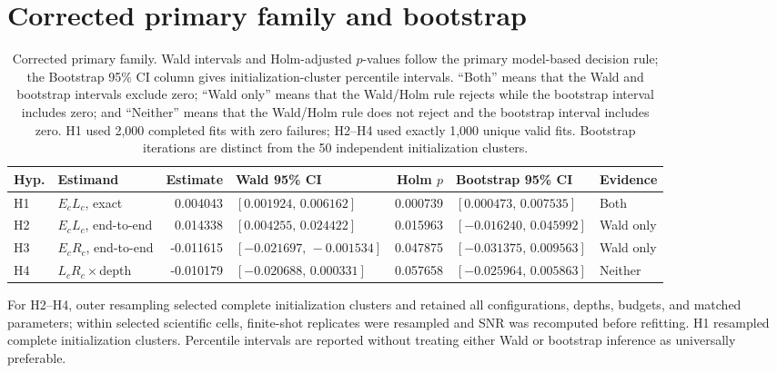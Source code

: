 \documentclass[pdflatex,sn-basic,Numbered]{sn-jnl}
\begin{document}
\section{Corrected primary family and bootstrap}

\begin{table}[t]
\centering
\footnotesize
\begin{tabularx}{\textwidth}{@{}l p{} r l r l >{\raggedright\arraybackslash}X@{}}
\toprule
Hyp. & Estimand & Estimate & Wald 95\% CI & Holm $p$ & Bootstrap 95\% CI & Evidence \\
\midrule
H1 & $E_cL_c$, exact
   & 0.004043
   & \mbox{$[0.001924,\,0.006162]$}
   & 0.000739
   & \mbox{$[0.000473,\,0.007535]$}
   & Both \\
H2 & $E_cL_c$, end-to-end
   & 0.014338
   & \mbox{$[0.004255,\,0.024422]$}
   & 0.015963
   & \mbox{$[-0.016240,\,0.045992]$}
   & Wald only \\
H3 & $E_cR_c$, end-to-end
   & -0.011615
   & \mbox{$[-0.021697,\,-0.001534]$}
   & 0.047875
   & \mbox{$[-0.031375,\,0.009563]$}
   & Wald only \\
H4 & $L_cR_c\times$depth
   & -0.010179
   & \mbox{$[-0.020688,\,0.000331]$}
   & 0.057658
   & \mbox{$[-0.025964,\,0.005863]$}
   & Neither \\
\bottomrule
\end{tabularx}
\caption{Corrected primary family. Wald intervals and Holm-adjusted $p$-values follow the primary model-based decision rule; the Bootstrap 95\% CI column gives initialization-cluster percentile intervals. ``Both'' means that the Wald and bootstrap intervals exclude zero; ``Wald only'' means that the Wald/Holm rule rejects while the bootstrap interval includes zero; and ``Neither'' means that the Wald/Holm rule does not reject and the bootstrap interval includes zero. H1 used 2,000 completed fits with zero failures; H2--H4 used exactly 1,000 unique valid fits. Bootstrap iterations are distinct from the 50 independent initialization clusters.}
\label{supp:tab:primary}
\end{table}

For H2--H4, outer resampling selected complete initialization clusters and retained all configurations, depths, budgets, and matched parameters; within selected scientific cells, finite-shot replicates were resampled and SNR was recomputed before refitting. H1 resampled complete initialization clusters. Percentile intervals are reported without treating either Wald or bootstrap inference as universally preferable.
\end{document}
